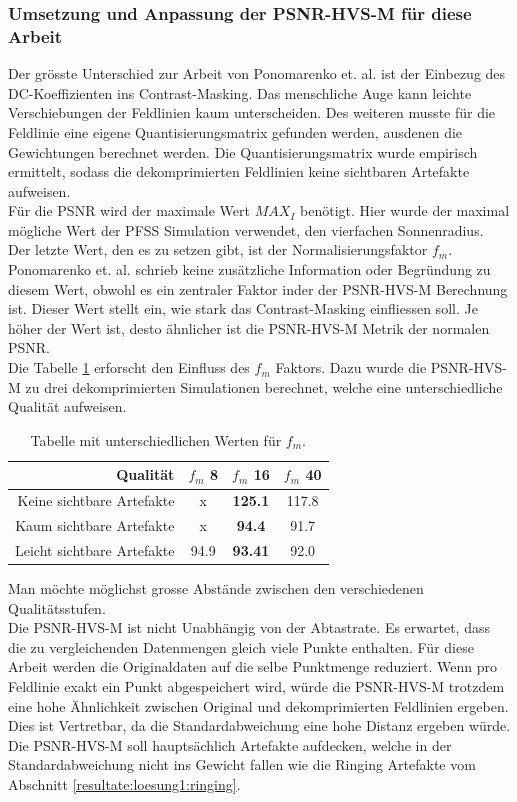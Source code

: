 \subsubsection{Umsetzung und Anpassung der PSNR-HVS-M für diese Arbeit}
Der grösste Unterschied zur Arbeit von Ponomarenko et. al. ist der Einbezug des DC-Koeffizienten ins Contrast-Masking. Das menschliche Auge kann leichte Verschiebungen der Feldlinien kaum unterscheiden. Des weiteren musste für die Feldlinie eine eigene Quantisierungsmatrix gefunden werden, ausdenen die Gewichtungen berechnet werden. Die Quantisierungsmatrix wurde empirisch ermittelt, sodass die dekomprimierten Feldlinien keine sichtbaren Artefakte aufweisen.\\
Für die PSNR wird der maximale Wert $MAX_I$ benötigt. Hier wurde der maximal mögliche Wert der PFSS Simulation verwendet, den vierfachen Sonnenradius.\\
Der letzte Wert, den es zu setzen gibt, ist der Normalisierungsfaktor $f_m$. Ponomarenko et. al. schrieb keine zusätzliche Information oder Begründung zu diesem Wert, obwohl es ein zentraler Faktor inder der PSNR-HVS-M Berechnung ist. Dieser Wert stellt ein, wie stark das Contrast-Masking einfliessen soll. Je höher der Wert ist, desto ähnlicher ist die PSNR-HVS-M Metrik der normalen PSNR.\\
Die Tabelle \ref{testsetup:psnr:umsetzung:tabelle:f_m} erforscht den Einfluss des $f_m$ Faktors. Dazu wurde die PSNR-HVS-M zu drei dekomprimierten Simulationen berechnet, welche eine unterschiedliche Qualität aufweisen.
\begin{table}
\center
\begin{tabular}{r|c|c|c}
	Qualität &$f_m$ 8 &$f_m$ 16 &$f_m$ 40 \\\hline
	Keine sichtbare Artefakte & x & \textbf{125.1} & 117.8 \\
	Kaum sichtbare Artefakte & x & \textbf{94.4} & 91.7\\
	Leicht sichtbare Artefakte & 94.9 & \textbf{93.41} & 92.0
\end{tabular}
\caption{Tabelle mit unterschiedlichen Werten für $f_m$.}
\label{testsetup:psnr:umsetzung:tabelle:f_m}
\end{table}
Man möchte möglichst grosse Abstände zwischen den verschiedenen Qualitätsstufen.\\
[\baselineskip]
Die PSNR-HVS-M ist nicht Unabhängig von der Abtastrate. Es erwartet, dass die zu vergleichenden Datenmengen gleich viele Punkte enthalten. Für diese Arbeit werden die Originaldaten auf die selbe Punktmenge reduziert. Wenn pro Feldlinie exakt ein Punkt abgespeichert wird, würde die PSNR-HVS-M trotzdem eine hohe Ähnlichkeit zwischen Original und dekomprimierten Feldlinien ergeben. Dies ist Vertretbar, da die Standardabweichung eine hohe Distanz ergeben würde. Die PSNR-HVS-M soll hauptsächlich Artefakte aufdecken, welche in der Standardabweichung nicht ins Gewicht fallen wie die Ringing Artefakte vom Abschnitt \ref{resultate:loesung1:ringing}.